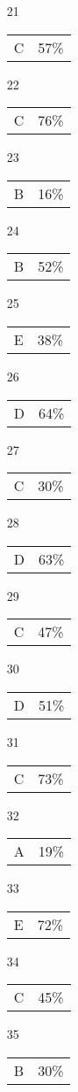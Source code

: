 \documentclass[12pt]{article}
\begin{document}
\begin{multicols}{5}
\begin{enumerate}
\item[21] \begin{tabular}{cc} C & 57\%\end{tabular}
\item[22] \begin{tabular}{cc} C & 76\%\end{tabular}
\item[23] \begin{tabular}{cc} B & 16\%\end{tabular}
\item[24] \begin{tabular}{cc} B & 52\%\end{tabular}
\item[25] \begin{tabular}{cc} E & 38\%\end{tabular}
\item[]
\item[26] \begin{tabular}{cc} D & 64\%\end{tabular}
\item[27] \begin{tabular}{cc} C & 30\%\end{tabular}
\item[28] \begin{tabular}{cc} D & 63\%\end{tabular}
\item[29] \begin{tabular}{cc} C & 47\%\end{tabular}
\item[30] \begin{tabular}{cc} D & 51\%\end{tabular}
\item[]
\item[31] \begin{tabular}{cc} C & 73\%\end{tabular}
\item[32] \begin{tabular}{cc} A & 19\%\end{tabular}
\item[33] \begin{tabular}{cc} E & 72\%\end{tabular}
\item[34] \begin{tabular}{cc} C & 45\%\end{tabular}
\item[35] \begin{tabular}{cc} B & 30\%\end{tabular}

\end{enumerate}
\end{multicols}
\end{document}
